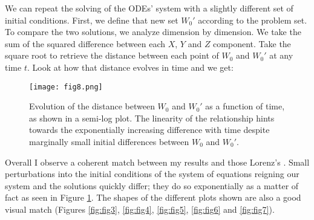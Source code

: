 \documentclass{article}
\begin{document}
\break

We can repeat the solving of the ODEs' system with a slightly different set of initial conditions. First, we define that new set $W_0'$ according to the problem set. To compare the two solutions, we analyze dimension by dimension. We take the sum of the squared difference between each $X$, $Y$ and $Z$ component. Take the square root to retrieve the distance between each point of $W_0$ and $W_0'$ at any time $t$. Look at how that distance evolves in time and we get:

\begin{figure}[h!]
    \centering
	\texttt{[image: fig8.png]}
	\caption{Evolution of the distance between $W_0$ and $W_0'$ as a function of time, as shown in a semi-log plot. The linearity of the relationship hints towards the exponentially increasing difference with time despite marginally small initial differences between $W_0$ and $W_0'$.}
	\label{fig:fig8}
\end{figure}

\break 

Overall I observe a coherent match between my results and those Lorenz's \cite{lorenz_deterministic_1963}. Small perturbations into the initial conditions of the system of equations reigning our system and the solutions quickly differ; they do so exponentially as a matter of fact as seen in Figure \ref{fig:fig8}. The shapes of the different plots shown are also a good visual match (Figures \ref{fig:fig3}, \ref{fig:fig4}, \ref{fig:fig5}, \ref{fig:fig6} and \ref{fig:fig7}). 

\printbibliography
\end{document}
